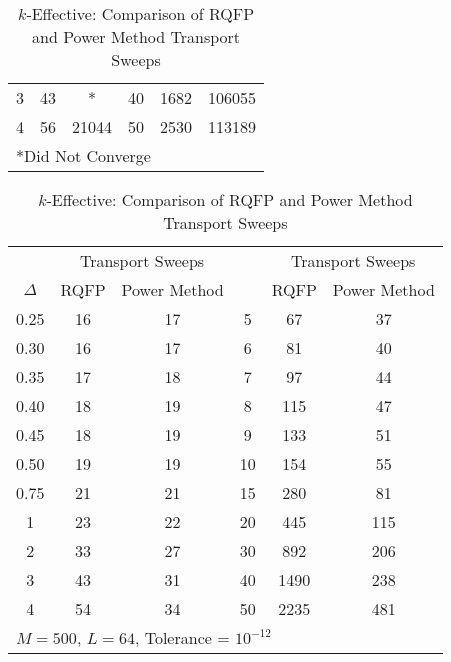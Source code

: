 \begin{table}[!htbp]
\begin{subtable}[h]{1.0\textwidth}
\begin{tabular}{@{}cccccc@{}}
	3 & 43 & * & 40 & 1682 & 106055 \\ 
	4 & 56 & 21044 & 50 & 2530 & 113189 \\
	\bottomrule
	\multicolumn{6}{l}{*Did Not Converge} \\
	\end{tabular}
	\caption{Alpha-Eigenvalue: Comparison of RQFP and Critical Search Sweeps}
	\label{table:CompMultSweeps}
	\end{subtable}%
	\vspace{0.25cm}
	\begin{subtable}[h]{1.0\textwidth}
	\centering{}
	\begin{tabular}{@{}cccccc@{}}\toprule
	& \multicolumn{2}{c}{Transport Sweeps} & & \multicolumn{2}{c}{Transport Sweeps} \\
	\cmidrule{2-3} \cmidrule{5-6} $\Delta$ & RQFP & Power Method \quad &  \Delta & RQFP & Power Method\\
	\midrule
	0.25 & 16 & 17 & 5 & 67 & 37 \\
	0.30 & 16 & 17 & 6 & 81 & 40 \\
	0.35 & 17 & 18 & 7 & 97 & 44 \\
	0.40 & 18 & 19 & 8 & 115 & 47 \\
	0.45 & 18 & 19 & 9 & 133 & 51 \\
	0.50 & 19 & 19 & 10 & 154 & 55 \\
	0.75 & 21 & 21 & 15 & 280 & 81 \\
	1 & 23 & 22 & 20 & 445 & 115 \\
	2 & 33 & 27 & 30 & 892 & 206 \\
	3 & 43 & 31 & 40 & 1490 & 238 \\
	4 & 54 & 34 & 50 & 2235 & 481 \\
	\bottomrule
	\multicolumn{6}{l}{$M = 500$, $L = 64$, Tolerance = $10^{-12}$} \\
	\end{tabular}
	\caption{$k$-Effective: Comparison of RQFP and Power Method Transport Sweeps}
	\label{table:CompMultSweepsK}
	\end{subtable}
\end{table}

